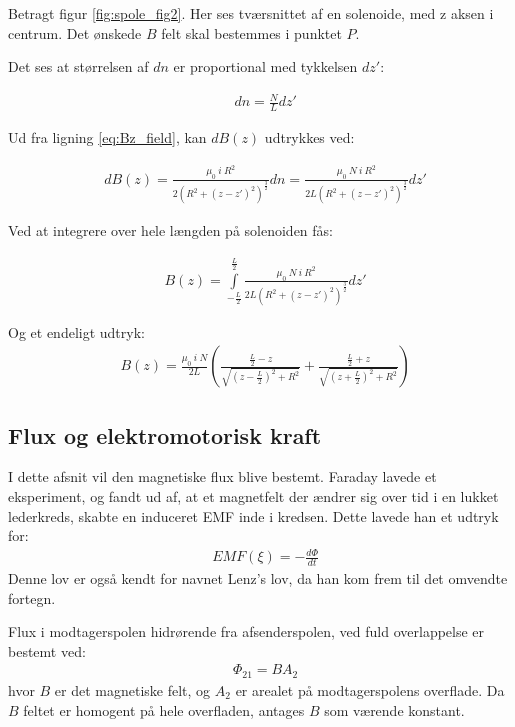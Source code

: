 Betragt figur \ref{fig:spole_fig2}. Her ses tværsnittet af en solenoide, med z aksen i centrum. Det ønskede $B$ felt skal bestemmes i punktet $P$.

Det ses at størrelsen af $dn$ er proportional med tykkelsen $dz'$:

\begin{align}
	&dn=\frac{N}{L} dz'
\end{align}



Ud fra ligning \ref{eq:Bz_field}, kan $dB(z)$ udtrykkes ved: 

\begin{align}
	&dB(z)=\frac{\mu_0 \: i \: R^2}{2(R^2+(z-z')^2)^\frac{3}{2}}dn=\frac{\mu_0 \: N \: i \: R^2}{2L(R^2+(z-z')^2)^\frac{3}{2}}dz'
\end{align}

Ved at integrere over hele længden på solenoiden fås:

\begin{align}
	&B(z)=\int\limits_{-\frac{L}{2}}^{\frac{L}{2}}\frac{\mu_0 \: N \: i \: R^2}{2L(R^2+(z-z')^2)^\frac{3}{2}}dz'
\end{align}

Og et endeligt udtryk:
\begin{align}
	&B(z)= \frac{\mu_0 \: i \: N}{2L}\left(\frac{\frac{L}{2}-z}{\sqrt{(z-\frac{L}{2})^2+R^2}}+\frac{\frac{L}{2}+z}{\sqrt{(z+\frac{L}{2})^2+R^2}}\right) \label{eq:B_field2}
\end{align}
\subsection{Flux og elektromotorisk kraft}
I dette afsnit vil den magnetiske flux blive bestemt.  
Faraday lavede et eksperiment, og fandt ud af, at et magnetfelt der ændrer sig over tid i en lukket lederkreds, skabte en induceret EMF inde i kredsen.
Dette lavede han et udtryk for:
\begin{align}
	&EMF(\xi) = - \frac{d\Phi}{dt}
\end{align}
Denne lov er også kendt for navnet Lenz's lov, da han kom frem til det omvendte fortegn.

Flux i modtagerspolen hidrørende fra afsenderspolen, ved fuld overlappelse er bestemt ved:
\begin{align}
	&\Phi_{21} = BA_2
\end{align}
hvor $B$ er det magnetiske felt, og $A_2$ er arealet på modtagerspolens overflade.
Da $B$ feltet er homogent på hele overfladen, antages $B$ som værende konstant. 

